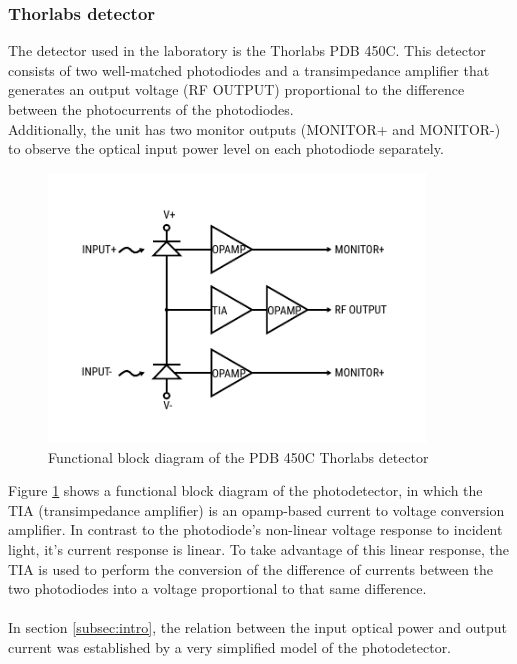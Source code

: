 \subsubsection{Thorlabs detector}
%
The detector used in the laboratory is the Thorlabs PDB 450C. This detector consists of two well-matched photodiodes and a transimpedance amplifier that generates an output voltage (RF OUTPUT) proportional to the difference between the photocurrents of the photodiodes.\\
Additionally, the unit has two monitor outputs (MONITOR+ and MONITOR-) to observe the optical input power level on each photodiode separately.
\cite{thorlabs}
%
\begin{figure}[H]
	\centering
	\includegraphics[width=10cm]{./sdf/optical_detection/figures/thorlabs-circuit.pdf}
	\caption{Functional block diagram of the PDB 450C Thorlabs detector \cite{thorlabs}}
	\label{fig:photodetector-circuit}
\end{figure}
%
\noindent
Figure \ref{fig:photodetector-circuit} shows a functional block diagram of the photodetector, in which the TIA (transimpedance amplifier) is an opamp-based current to voltage conversion amplifier.
In contrast to the photodiode's non-linear voltage response to incident light, it's current response is linear.
To take advantage of this linear response, the TIA is used to perform the conversion of the difference of currents between the two photodiodes into a voltage proportional to that same difference.\\
%
\\
In section \ref{subsec:intro}, the relation between the input optical power and output current was established by a very simplified model of the photodetector.
%
